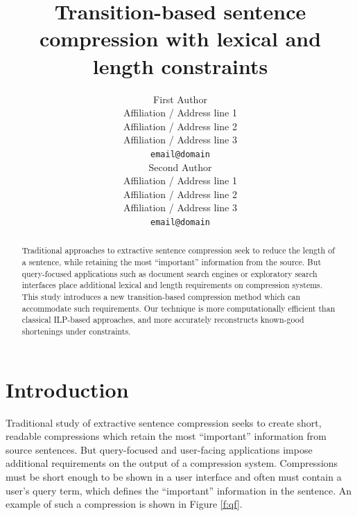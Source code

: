 \documentclass[11pt,a4paper]{article}
\title{Transition-based sentence compression with lexical and length constraints}
\author{First Author \\
  Affiliation / Address line 1 \\
  Affiliation / Address line 2 \\
  Affiliation / Address line 3 \\
  {\tt email@domain} \\\And
  Second Author \\
  Affiliation / Address line 1 \\
  Affiliation / Address line 2 \\
  Affiliation / Address line 3 \\
  {\tt email@domain} \\}
\date{}
\newcommand{\ahcomment}[1]{\textcolor{blue}{[#1 -AH]}}
\begin{document}
\maketitle




\begin{abstract}
Traditional approaches to extractive sentence compression seek to reduce the length of a sentence, while retaining the most ``important'' information from the source. But query-focused applications such as document search engines or exploratory search interfaces place additional lexical and length requirements on compression systems. This study introduces a new transition-based compression method which can accommodate such requirements.  Our technique is more computationally efficient than classical ILP-based approaches, and more accurately reconstructs known-good shortenings under constraints. 
\end{abstract}

\section{Introduction}

Traditional study of extractive sentence compression seeks to create short, readable compressions which retain the most ``important'' information from source sentences. But query-focused and user-facing applications impose additional requirements on the output of a compression system. Compressions must be short enough to be shown in a user interface and often must contain a user's query term, which defines the ``important'' information in the sentence. An example of such a compression is shown in Figure \ref{f:qf}.
\end{document}
